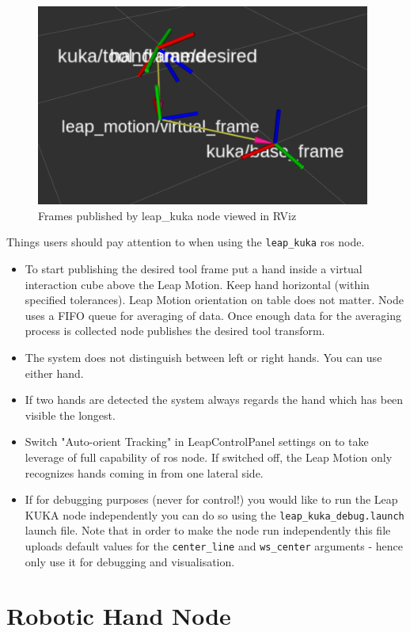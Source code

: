 \documentclass[headsepline,footinclude=false,fontsize=11pt,paper=a4,listof=totoc,bibliography=totoc,BCOR=12mm,DIV=14]{scrbook}
\begin{document}
\begin{figure}[h]
    \centering
    \includegraphics[width=11cm]{figures/leap_frames_rviz}
    \caption{Frames published by leap\_kuka node viewed in RViz}
    \label{fig:leap_rviz}
\end{figure}

Things users should pay attention to when using the \texttt{leap\_kuka} \gls{ros} node. 
\begin{itemize}
	\item To start publishing the desired tool frame put a hand inside a virtual interaction cube above the Leap Motion. Keep hand horizontal (within specified tolerances). Leap Motion orientation on table does not matter. Node uses a FIFO queue for averaging of data. Once enough data for the averaging process is collected node publishes the desired tool transform. 
	\item The system does not distinguish between left or right hands. You can use either hand.
	\item If two hands are detected the system always regards the hand which has been visible the longest.
	\item Switch "Auto-orient Tracking" in LeapControlPanel settings on to take leverage of full capability of \gls{ros} node. If switched off, the Leap Motion only recognizes hands coming in from one lateral side.
	\item If for debugging purposes (never for control!) you would like to run the Leap KUKA node independently you can do so using the \texttt{leap\_kuka\_debug.launch} launch file. Note that in order to make the node run independently this file uploads default values for the \texttt{center\_line} and  \texttt{ws\_center} arguments - hence only use it for debugging and visualisation. 
\end{itemize}

\chapter{Robotic Hand Node} \label{hand}
\end{document}

